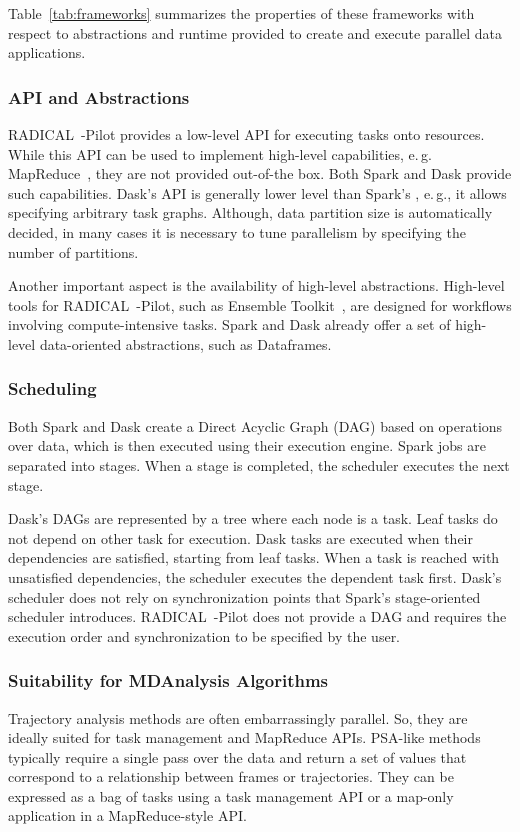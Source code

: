 Table~\ref{tab:frameworks} summarizes the properties of these frameworks with respect to abstractions and runtime provided to create and execute parallel data applications. 

\subsubsection*{API and Abstractions} 
RADICAL~-Pilot provides a low-level API for executing tasks onto resources.
While this API can be used to implement high-level capabilities, e.\,g. MapReduce~\cite{mantha2012pilot}, they are not provided out-of-the box.
Both Spark and Dask provide such capabilities.
Dask's API is generally lower level than Spark's , e.\,g., it allows specifying arbitrary task graphs.
Although, data partition size is automatically decided, in many cases it is necessary to tune parallelism by specifying the number of partitions.

Another important aspect is the availability of high-level abstractions.
High-level tools for RADICAL~-Pilot, such as Ensemble Toolkit~\cite{balasubramanian2018harnessing}, are designed for workflows involving compute-intensive tasks.
Spark and Dask already offer a set of high-level data-oriented abstractions, such as Dataframes.

\subsubsection*{Scheduling}
Both Spark and Dask create a Direct Acyclic Graph (DAG) based on operations over data, which is then executed using their execution engine.
Spark jobs are separated into stages.
When a stage is completed, the scheduler executes the next stage.

Dask's DAGs are represented by a tree where each node is a task.
Leaf tasks do not depend on other task for execution.
Dask tasks are executed when their dependencies are satisfied, starting from leaf tasks.
When a task is reached with unsatisfied dependencies, the scheduler executes the dependent task first.
Dask's scheduler does not rely on synchronization points that Spark's stage-oriented scheduler introduces.
RADICAL~-Pilot does not provide a DAG and requires the execution order and synchronization to be specified by the user.

\subsubsection*{Suitability for MDAnalysis Algorithms}
Trajectory analysis methods are often embarrassingly parallel.
So, they are ideally suited for task management and MapReduce APIs.
PSA-like methods typically require a single pass over the data and return a set of values that correspond to a relationship between frames or trajectories.
They can be expressed as a bag of tasks using a task management API or a map-only application in a MapReduce-style API.

